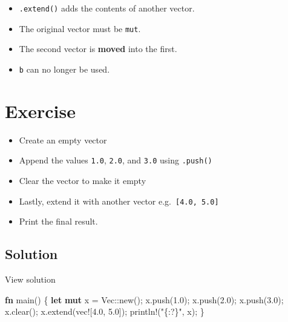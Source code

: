 \documentclass[
  letterpaper,
  DIV=11,
  numbers=noendperiod,
  oneside]{scrreprt}
\newenvironment{Shaded}{\begin{snugshade}}{\end{snugshade}}
\newcommand{\DataTypeTok}[1]{\textcolor[rgb]{0.68,0.00,0.00}{#1}}
\newcommand{\DecValTok}[1]{\textcolor[rgb]{0.68,0.00,0.00}{#1}}
\newcommand{\KeywordTok}[1]{\textcolor[rgb]{0.00,0.23,0.31}{\textbf{#1}}}
\newcommand{\NormalTok}[1]{\textcolor[rgb]{0.00,0.23,0.31}{#1}}
\newcommand{\OperatorTok}[1]{\textcolor[rgb]{0.37,0.37,0.37}{#1}}
\newcommand{\PreprocessorTok}[1]{\textcolor[rgb]{0.68,0.00,0.00}{#1}}
\newcommand{\StringTok}[1]{\textcolor[rgb]{0.13,0.47,0.30}{#1}}
\providecommand{\tightlist}{%
  \setlength{\itemsep}{0pt}\setlength{\parskip}{0pt}}\usepackage{longtable,booktabs,array}
\begin{document}
\begin{itemize}
\tightlist
\item
  \texttt{.extend()} adds the contents of another vector.
\item
  The original vector must be \texttt{mut}.
\item
  The second vector is \textbf{moved} into the first.
\item
  \texttt{b} can no longer be used.
\end{itemize}

\section{Exercise}\label{exercise-5}

\begin{itemize}
\tightlist
\item
  Create an empty vector
\item
  Append the values \texttt{1.0}, \texttt{2.0}, and \texttt{3.0} using
  \texttt{.push()}
\item
  Clear the vector to make it empty
\item
  Lastly, extend it with another vector e.g.~\texttt{{[}4.0,\ 5.0{]}}
\item
  Print the final result.
\end{itemize}

\subsection{Solution}\label{solution-5}

View solution

\begin{Shaded}
\begin{Highlighting}[]
\KeywordTok{fn}\NormalTok{ main() }\OperatorTok{\{}
    \KeywordTok{let} \KeywordTok{mut}\NormalTok{ x }\OperatorTok{=} \DataTypeTok{Vec}\PreprocessorTok{::}\NormalTok{new()}\OperatorTok{;}
\NormalTok{    x}\OperatorTok{.}\NormalTok{push(}\DecValTok{1.0}\NormalTok{)}\OperatorTok{;}
\NormalTok{    x}\OperatorTok{.}\NormalTok{push(}\DecValTok{2.0}\NormalTok{)}\OperatorTok{;}
\NormalTok{    x}\OperatorTok{.}\NormalTok{push(}\DecValTok{3.0}\NormalTok{)}\OperatorTok{;}
\NormalTok{    x}\OperatorTok{.}\NormalTok{clear()}\OperatorTok{;}
\NormalTok{    x}\OperatorTok{.}\NormalTok{extend(}\PreprocessorTok{vec!}\NormalTok{[}\DecValTok{4.0}\OperatorTok{,} \DecValTok{5.0}\NormalTok{])}\OperatorTok{;}
    \PreprocessorTok{println!}\NormalTok{(}\StringTok{"\{:?\}"}\OperatorTok{,}\NormalTok{ x)}\OperatorTok{;}
\OperatorTok{\}}
\end{Highlighting}
\end{Shaded}
\end{document}
